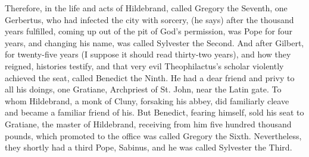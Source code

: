 Therefore, in the life and acts of Hildebrand, called Gregory the Seventh, one Gerbertus, who had infected the city with sorcery, (he says) after the thousand years fulfilled, coming up out of the pit of God’s permission, was Pope for four years, and changing his name, was called Sylvester the Second. And after Gilbert, for twenty-five years (I suppose it should read thirty-two years), and how they reigned, histories testify, and that very evil Theophilactus’s scholar violently achieved the seat, called Benedict the Ninth. He had a dear friend and privy to all his doings, one Gratiane, Archpriest of St. John, near the Latin gate. To whom Hildebrand, a monk of Cluny, forsaking his abbey, did familiarly cleave and became a familiar friend of his. But Benedict, fearing himself, sold his seat to Gratiane, the master of Hildebrand, receiving from him five hundred thousand pounds, which promoted to the office was called Gregory the Sixth. Nevertheless, they shortly had a third Pope, Sabinus, and he was called Sylvester the Third.

